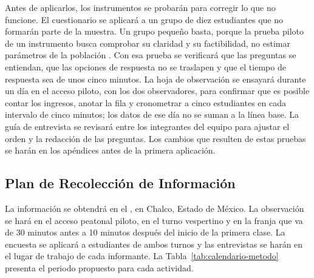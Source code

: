 Antes de aplicarlos, los instrumentos se probarán para corregir lo que no
funcione. El cuestionario se aplicará a un grupo de diez estudiantes que no
formarán parte de la muestra. Un grupo pequeño basta, porque la prueba
piloto de un instrumento busca comprobar su claridad y su factibilidad, no
estimar parámetros de la población \parencite{hertzog2008pilot}. Con esa
prueba se verificará que las preguntas se entiendan,
que las opciones de respuesta no se traslapen y que el tiempo de respuesta
sea de unos cinco minutos. La hoja de observación se ensayará durante un día
en el acceso piloto, con los dos observadores, para confirmar que es posible
contar los ingresos, anotar la fila y cronometrar a cinco estudiantes en cada
intervalo de cinco minutos; los datos de ese día no se suman a la línea base.
La guía de entrevista se revisará entre los integrantes del equipo para
ajustar el orden y la redacción de las preguntas. Los cambios que resulten de
estas pruebas se harán en los apéndices antes de la primera aplicación.

\subsection{Plan de Recolección de Información}
La información se obtendrá en el \tescha{}, en Chalco, Estado de México. La
observación se hará en el acceso peatonal piloto, en el turno vespertino y en
la franja que va de 30 minutos antes a 10 minutos después del inicio de la
primera clase. La encuesta se aplicará a estudiantes de ambos turnos y las
entrevistas se harán en el lugar de trabajo de cada informante. La
Tabla~\ref{tab:calendario-metodo} presenta el periodo propuesto para cada
actividad.


